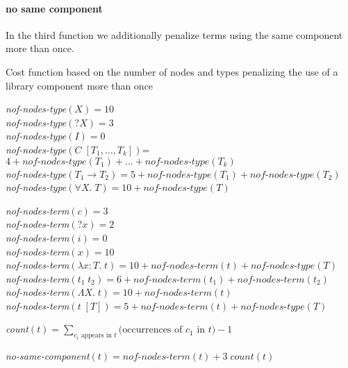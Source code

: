   \paragraph{no same component}
In the third function we additionally penalize terms using the same component more than once.
%
\begin{algorithm}[h]
\caption{Cost function based on the number of nodes and types penalizing the use of a library component more than once}

\textit{nof-nodes-type}$(X) = 10$\\
\textit{nof-nodes-type}$({?X}) = 3$\\
\textit{nof-nodes-type}$(I) = 0$\\
\textit{nof-nodes-type}$(C\; [T_1, \ldots, T_k])$= $4 + \textit{nof-nodes-type}(T_1) + \ldots + \textit{nof-nodes-type}(T_k)$\\
\textit{nof-nodes-type}$(T_1 \rightarrow T_2) = 5 + \textit{nof-nodes-type}(T_1) + \textit{nof-nodes-type}(T_2)$\\
\textit{nof-nodes-type}$(\forall X.\; T) = 10 + \textit{nof-nodes-type}(T)$\\

\BlankLine

\textit{nof-nodes-term}$(c) = 3$\\
\textit{nof-nodes-term}$({?x}) = 2$\\
\textit{nof-nodes-term}$(i) = 0$\\
\textit{nof-nodes-term}$(x) = 10$\\
\textit{nof-nodes-term}$(\lambda x : T.\; t) = 10 + \textit{nof-nodes-term}(t) + \textit{nof-nodes-type}(T)$\\
\textit{nof-nodes-term}$(t_1\; t_2) = 6 + \textit{nof-nodes-term}(t_1) + \textit{nof-nodes-term}(t_2)$\\
\textit{nof-nodes-term}$(\Lambda X.\; t) = 10 + \textit{nof-nodes-term}(t)$\\
\textit{nof-nodes-term}$(t\; [T]) = 5 + \textit{nof-nodes-term}(t) + \textit{nof-nodes-type}(T)$\\

\BlankLine

\textit{count}$(t) = \displaystyle \sum_{c_i \text{ appears in } t} \text{(occurrences of $c_1$ in $t$)} - 1$\\

\BlankLine

\textit{no-same-component}$(t) = \textit{nof-nodes-term}(t) + 3\; \textit{count}(t)$
\end{algorithm} 
%

